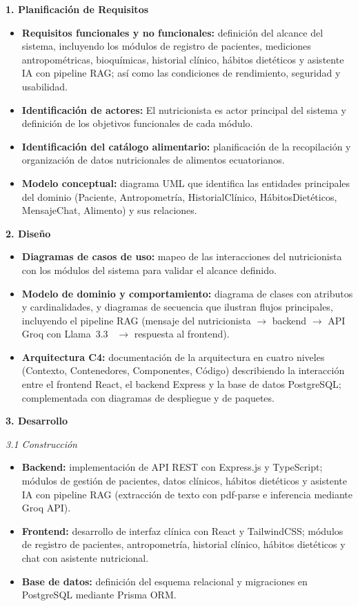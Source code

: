 \textbf{1. Planificación de Requisitos}
\begin{itemize}
  \item \textbf{Requisitos funcionales y no funcionales:} definición del alcance del  sistema, incluyendo los módulos de registro de pacientes, mediciones antropométricas, bioquímicas, historial clínico, hábitos dietéticos y asistente IA con pipeline RAG; así como las condiciones de rendimiento, seguridad y usabilidad.
  \item \textbf{Identificación de actores:} El nutricionista es actor principal del sistema y definición de los objetivos
  funcionales de cada módulo.
  \item \textbf{Identificación del catálogo alimentario:} planificación de la recopilación y organización
  de datos nutricionales de alimentos ecuatorianos.
  \item \textbf{Modelo conceptual:} diagrama UML que identifica las entidades
  principales del dominio (Paciente, Antropometría, HistorialClínico,
  HábitosDietéticos, MensajeChat, Alimento) y sus relaciones.
\end{itemize}

\textbf{2. Diseño}
\begin{itemize}
  \item \textbf{Diagramas de casos de uso:} mapeo de las interacciones del
  nutricionista con los módulos del sistema para validar el alcance definido.
  
  \item \textbf{Modelo de dominio y comportamiento:} diagrama de clases con
  atributos y cardinalidades, y diagramas de secuencia que ilustran flujos  principales, incluyendo el pipeline RAG (mensaje del nutricionista
  $\rightarrow$ backend $\rightarrow$ API Groq con Llama~3.3~\cite{grattafiori2024} $\rightarrow$
  respuesta al frontend).
  \item \textbf{Arquitectura C4:} documentación de la arquitectura en cuatro
  niveles (Contexto, Contenedores, Componentes, Código) describiendo la
  interacción entre el frontend React, el backend Express y la base de datos
  PostgreSQL; complementada con diagramas de despliegue y de paquetes.
\end{itemize}

\textbf{3. Desarrollo}

\textit{3.1 Construcción}
\begin{itemize}
  \item \textbf{Backend:} implementación de API REST con Express.js y TypeScript; módulos de gestión de pacientes, datos clínicos, hábitos dietéticos y asistente IA con pipeline RAG (extracción de texto con pdf-parse e inferencia mediante Groq API).
  \item \textbf{Frontend:} desarrollo de interfaz clínica con React y TailwindCSS; módulos de registro de pacientes, antropometría, historial clínico, hábitos dietéticos y chat con asistente nutricional.
  \item \textbf{Base de datos:} definición del esquema relacional y migraciones en PostgreSQL mediante Prisma ORM.
\end{itemize}

